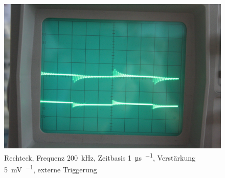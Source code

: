 \begin{figure}[htbp]
	\centering
	\begin{minipage}{.45\linewidth}
	\end{minipage}
	\hfill
	\begin{minipage}{.45\linewidth}
	\includegraphics[width=\linewidth]{Fotos/IMG_0756-1500.jpg}
	\end{minipage}
	\caption{%
		Rechteck, Frequenz \SI{200}{\kilo\hertz}, Zeitbasis \SI{1}{\micro\second\per\division}, Verstärkung \SI{5}{\milli\volt\per\division}, externe Triggerung
	}
	\label{fig:0756}
\end{figure}

